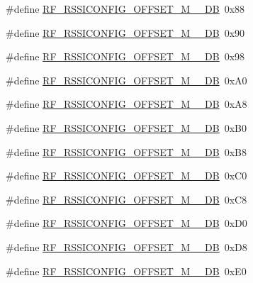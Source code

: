 \begin{DoxyCompactItemize}
\item 
\#define \mbox{\hyperlink{sx1276_regs-_fsk_8h_ad7fb49ed509ef7fb18fadda22bf06f11}{R\+F\+\_\+\+R\+S\+S\+I\+C\+O\+N\+F\+I\+G\+\_\+\+O\+F\+F\+S\+E\+T\+\_\+\+M\+\_\+\_\+\+DB}}~0x88
\item 
\#define \mbox{\hyperlink{sx1276_regs-_fsk_8h_abbd9ed83c6fbecfcce7c527e34d04ec0}{R\+F\+\_\+\+R\+S\+S\+I\+C\+O\+N\+F\+I\+G\+\_\+\+O\+F\+F\+S\+E\+T\+\_\+\+M\+\_\+\_\+\+DB}}~0x90
\item 
\#define \mbox{\hyperlink{sx1276_regs-_fsk_8h_ae0e47dc6a207da992b1ac902a110f9d7}{R\+F\+\_\+\+R\+S\+S\+I\+C\+O\+N\+F\+I\+G\+\_\+\+O\+F\+F\+S\+E\+T\+\_\+\+M\+\_\+\_\+\+DB}}~0x98
\item 
\#define \mbox{\hyperlink{sx1276_regs-_fsk_8h_a3e5e74a8043abbe4a998705c64a85970}{R\+F\+\_\+\+R\+S\+S\+I\+C\+O\+N\+F\+I\+G\+\_\+\+O\+F\+F\+S\+E\+T\+\_\+\+M\+\_\+\_\+\+DB}}~0x\+A0
\item 
\#define \mbox{\hyperlink{sx1276_regs-_fsk_8h_aba0e0493c2206484248dda87b2ca7134}{R\+F\+\_\+\+R\+S\+S\+I\+C\+O\+N\+F\+I\+G\+\_\+\+O\+F\+F\+S\+E\+T\+\_\+\+M\+\_\+\_\+\+DB}}~0x\+A8
\item 
\#define \mbox{\hyperlink{sx1276_regs-_fsk_8h_ac5d1af16b9ab32202350604e20ff97ca}{R\+F\+\_\+\+R\+S\+S\+I\+C\+O\+N\+F\+I\+G\+\_\+\+O\+F\+F\+S\+E\+T\+\_\+\+M\+\_\+\_\+\+DB}}~0x\+B0
\item 
\#define \mbox{\hyperlink{sx1276_regs-_fsk_8h_adc8551bf57dfe63c6f6f5ae1610dfb90}{R\+F\+\_\+\+R\+S\+S\+I\+C\+O\+N\+F\+I\+G\+\_\+\+O\+F\+F\+S\+E\+T\+\_\+\+M\+\_\+\_\+\+DB}}~0x\+B8
\item 
\#define \mbox{\hyperlink{sx1276_regs-_fsk_8h_a2974c4a75b7464841728fb56d662743b}{R\+F\+\_\+\+R\+S\+S\+I\+C\+O\+N\+F\+I\+G\+\_\+\+O\+F\+F\+S\+E\+T\+\_\+\+M\+\_\+\_\+\+DB}}~0x\+C0
\item 
\#define \mbox{\hyperlink{sx1276_regs-_fsk_8h_a90e12bf75d247cefc76360f6b6b65c36}{R\+F\+\_\+\+R\+S\+S\+I\+C\+O\+N\+F\+I\+G\+\_\+\+O\+F\+F\+S\+E\+T\+\_\+\+M\+\_\+\_\+\+DB}}~0x\+C8
\item 
\#define \mbox{\hyperlink{sx1276_regs-_fsk_8h_ad7061fda6354ecec243b4cf450f80fdf}{R\+F\+\_\+\+R\+S\+S\+I\+C\+O\+N\+F\+I\+G\+\_\+\+O\+F\+F\+S\+E\+T\+\_\+\+M\+\_\+\_\+\+DB}}~0x\+D0
\item 
\#define \mbox{\hyperlink{sx1276_regs-_fsk_8h_a9231b5019a52af5f09d67e4f0c76b681}{R\+F\+\_\+\+R\+S\+S\+I\+C\+O\+N\+F\+I\+G\+\_\+\+O\+F\+F\+S\+E\+T\+\_\+\+M\+\_\+\_\+\+DB}}~0x\+D8
\item 
\#define \mbox{\hyperlink{sx1276_regs-_fsk_8h_a3c584e4445cc29c7ea1faa931383f5bf}{R\+F\+\_\+\+R\+S\+S\+I\+C\+O\+N\+F\+I\+G\+\_\+\+O\+F\+F\+S\+E\+T\+\_\+\+M\+\_\+\_\+\+DB}}~0x\+E0

\end{DoxyCompactItemize}

